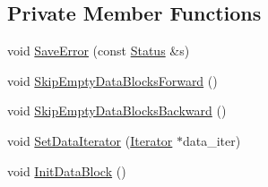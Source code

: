 \subsection*{Private Member Functions}
\begin{DoxyCompactItemize}
\item 
void \hyperlink{classleveldb_1_1anonymous__namespace_02two__level__iterator_8cc_03_1_1_two_level_iterator_a4316fdc28de93ea188d2c3a45995ca4e}{Save\+Error} (const \hyperlink{classleveldb_1_1_status}{Status} \&s)
\item 
void \hyperlink{classleveldb_1_1anonymous__namespace_02two__level__iterator_8cc_03_1_1_two_level_iterator_ad86ad6f263625df39409f44bc47c6540}{Skip\+Empty\+Data\+Blocks\+Forward} ()
\item 
void \hyperlink{classleveldb_1_1anonymous__namespace_02two__level__iterator_8cc_03_1_1_two_level_iterator_a04e7e9fcbea9d4ac35c71d4d430b4ae1}{Skip\+Empty\+Data\+Blocks\+Backward} ()
\item 
void \hyperlink{classleveldb_1_1anonymous__namespace_02two__level__iterator_8cc_03_1_1_two_level_iterator_ada5ab8faac914e18e5c3980f53da4d66}{Set\+Data\+Iterator} (\hyperlink{classleveldb_1_1_iterator}{Iterator} $\ast$data\+\_\+iter)
\item 
void \hyperlink{classleveldb_1_1anonymous__namespace_02two__level__iterator_8cc_03_1_1_two_level_iterator_a403663c0256c3f6d6f6b754fa2b9f0b1}{Init\+Data\+Block} ()
\end{DoxyCompactItemize}
